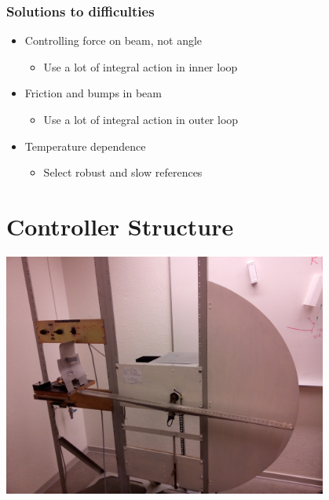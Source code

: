 \documentclass[
compress]
{beamer}
\begin{document}
\begin{frame}
\frametitle{Solutions to difficulties}
\begin{itemize}
\item Controlling force on beam, not angle
\begin{itemize}
\item Use a lot of integral action in inner loop
\end{itemize}
\item Friction and bumps in beam
\begin{itemize}
\item Use a lot of integral action in outer loop
\end{itemize}
\item Temperature dependence
\begin{itemize}
\item Select robust and slow references
\end{itemize}
\end{itemize}
\end{frame}

\section{Controller Structure}
\frame{\sectionpage}
\begin{frame}
\centering
\includegraphics[width=0.8\textwidth]{figures/process_fig.jpg}
\end{frame}
\end{document}
